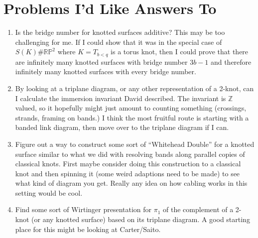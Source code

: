 \documentclass{amsart}
\theoremstyle{definition}
\begin{document}
\section{Problems I'd Like Answers To}

\begin{enumerate}
\item Is the bridge number for knotted surfaces additive? This may be too challenging for me. If I could show that it was in the special case of $S(K) \# \mathbb{RP}^{2}$ where $K = T_{b < q}$ is a torus knot, then I could prove that there are infinitely many knotted surfaces with bridge number $3b - 1$ and therefore infinitely many knotted surfaces with every bridge number.
\item By looking at a triplane diagram, or any other representation of a 2-knot, can I calculate the immersion invariant David described. The invariant is $\mathbb{Z}$ valued, so it hopefully might just amount to counting something (crossings, strands, framing on bands.) I think the most fruitful route is starting with a banded link diagram, then move over to the triplane diagram if I can.
\item Figure out a way to construct some sort of ``Whitehead Double'' for a knotted surface similar to what we did with resolving bands along parallel copies of classical knots. First maybe consider doing this construction to a classical knot and then spinning it (some weird adaptions need to be made) to see what kind of diagram you get. Really any idea on how cabling works in this setting would be cool.
\item Find some sort of Wirtinger presentation for $\pi_{1}$ of the complement of a 2-knot (or any knotted surface) based on its triplane diagram. A good starting place for this might be looking at Carter/Saito. 

\end{enumerate}
\end{document}
